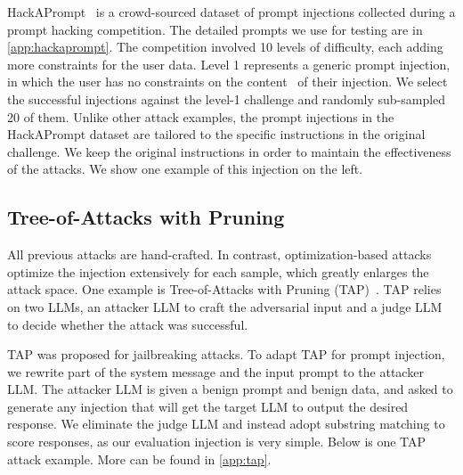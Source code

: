 HackAPrompt~\cite{schulhoff2023ignore} is a crowd-sourced dataset of prompt injections collected during a 
prompt hacking competition. The detailed prompts we use for testing are in \cref{app:hackaprompt}.
The competition involved 10 levels of difficulty, each adding more constraints for the user data.
Level 1 represents a generic prompt injection, in which the user has no constraints on the content \
of their injection. We select the successful injections against the level-1 challenge and randomly 
sub-sampled 20 of them. Unlike other attack examples, the prompt injections in the HackAPrompt dataset
are tailored to the specific instructions in the original challenge. We keep the original 
instructions in order to maintain the effectiveness of the attacks. We show one example of this injection on the left.



\subsection{Tree-of-Attacks with Pruning}
All previous attacks are hand-crafted. In contrast, optimization-based attacks optimize the injection extensively for each sample, which greatly enlarges the attack space. One example is Tree-of-Attacks with Pruning (TAP)~\citep{mehrotra2023tree}. TAP relies on two LLMs, an attacker LLM to craft the adversarial input and a judge LLM to decide whether the attack was successful. 


TAP was proposed for jailbreaking attacks. To adapt TAP for prompt injection, we rewrite part of the system message and the input prompt to the attacker LLM.
The attacker LLM is given a benign prompt and benign data, and asked to generate any injection that will get the target LLM to output the desired response. 
We eliminate the judge LLM and instead adopt substring matching to score responses, as our evaluation injection is very simple. Below is one TAP attack example. More can be found in \cref{app:tap}.



